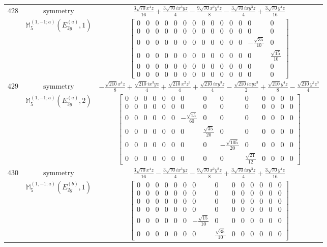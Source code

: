 \documentclass[fleqn,8pt,landscape]{jsarticle}
\begin{document}
\begin{longtable}{ccc}
$ 428 $ & $ \text{symmetry} $ & $ \frac{3 \sqrt{70} x^{4} z}{16} + \frac{3 \sqrt{70} i x^{3} y z}{4} - \frac{9 \sqrt{70} x^{2} y^{2} z}{8} - \frac{3 \sqrt{70} i x y^{3} z}{4} + \frac{3 \sqrt{70} y^{4} z}{16} $ \\
$  $ & $ \mathbb{M}_{5}^{(1,-1;a)}(E_{2g}^{(a)},1) $ & $ \begin{bmatrix} 0 & 0 & 0 & 0 & 0 & 0 & 0 & 0 & 0 & 0 & 0 & 0 & 0 & 0 \\ 0 & 0 & 0 & 0 & 0 & 0 & 0 & 0 & 0 & 0 & 0 & 0 & 0 & 0 \\ 0 & 0 & 0 & 0 & 0 & 0 & 0 & 0 & 0 & 0 & 0 & 0 & - \frac{\sqrt{35}}{10} & 0 \\ 0 & 0 & 0 & 0 & 0 & 0 & 0 & 0 & 0 & 0 & 0 & 0 & 0 & \frac{\sqrt{15}}{10} \\ 0 & 0 & 0 & 0 & 0 & 0 & 0 & 0 & 0 & 0 & 0 & 0 & 0 & 0 \\ 0 & 0 & 0 & 0 & 0 & 0 & 0 & 0 & 0 & 0 & 0 & 0 & 0 & 0 \end{bmatrix} $ \\ \hline
$ 429 $ & $ \text{symmetry} $ & $ - \frac{\sqrt{210} x^{4} z}{8} + \frac{\sqrt{210} i x^{3} y z}{4} + \frac{\sqrt{210} x^{2} z^{3}}{4} + \frac{\sqrt{210} i x y^{3} z}{4} - \frac{\sqrt{210} i x y z^{3}}{2} + \frac{\sqrt{210} y^{4} z}{8} - \frac{\sqrt{210} y^{2} z^{3}}{4} $ \\
$  $ & $ \mathbb{M}_{5}^{(1,-1;a)}(E_{2g}^{(a)},2) $ & $ \begin{bmatrix} 0 & 0 & 0 & 0 & 0 & 0 & 0 & 0 & 0 & 0 & 0 & 0 & 0 & 0 \\ 0 & 0 & 0 & 0 & 0 & 0 & 0 & 0 & 0 & 0 & 0 & 0 & 0 & 0 \\ 0 & 0 & 0 & 0 & 0 & 0 & - \frac{\sqrt{15}}{60} & 0 & 0 & 0 & 0 & 0 & 0 & 0 \\ 0 & 0 & 0 & 0 & 0 & 0 & 0 & \frac{\sqrt{35}}{20} & 0 & 0 & 0 & 0 & 0 & 0 \\ 0 & 0 & 0 & 0 & 0 & 0 & 0 & 0 & - \frac{\sqrt{105}}{20} & 0 & 0 & 0 & 0 & 0 \\ 0 & 0 & 0 & 0 & 0 & 0 & 0 & 0 & 0 & \frac{\sqrt{21}}{12} & 0 & 0 & 0 & 0 \end{bmatrix} $ \\ \hline
$ 430 $ & $ \text{symmetry} $ & $ \frac{3 \sqrt{70} x^{4} z}{16} - \frac{3 \sqrt{70} i x^{3} y z}{4} - \frac{9 \sqrt{70} x^{2} y^{2} z}{8} + \frac{3 \sqrt{70} i x y^{3} z}{4} + \frac{3 \sqrt{70} y^{4} z}{16} $ \\
$  $ & $ \mathbb{M}_{5}^{(1,-1;a)}(E_{2g}^{(b)},1) $ & $ \begin{bmatrix} 0 & 0 & 0 & 0 & 0 & 0 & 0 & 0 & 0 & 0 & 0 & 0 & 0 & 0 \\ 0 & 0 & 0 & 0 & 0 & 0 & 0 & 0 & 0 & 0 & 0 & 0 & 0 & 0 \\ 0 & 0 & 0 & 0 & 0 & 0 & 0 & 0 & 0 & 0 & 0 & 0 & 0 & 0 \\ 0 & 0 & 0 & 0 & 0 & 0 & 0 & 0 & 0 & 0 & 0 & 0 & 0 & 0 \\ 0 & 0 & 0 & 0 & 0 & 0 & - \frac{\sqrt{15}}{10} & 0 & 0 & 0 & 0 & 0 & 0 & 0 \\ 0 & 0 & 0 & 0 & 0 & 0 & 0 & \frac{\sqrt{35}}{10} & 0 & 0 & 0 & 0 & 0 & 0 \end{bmatrix} $ \\ \hline

\end{longtable}
\end{document}
